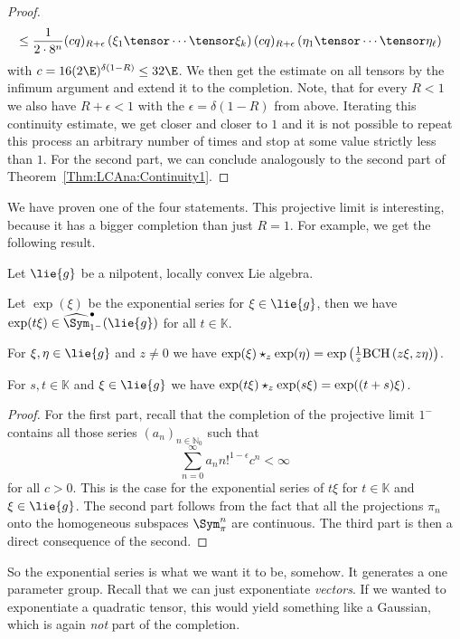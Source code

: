 \begin{proof}
\begin{align*}
        & \leq
        \frac{1}{2 \cdot 8^n}
        (c q)_{R + \epsilon} 
        \left( \xi_1 \tensor \cdots \tensor \xi_k \right)
        (c q)_{R + \epsilon} 
        \left( \eta_1 \tensor \cdots \tensor \eta_\ell \right)
    \end{align*}
    with $c = 16 (2 \E)^{\delta (1 - R)} \leq 32 \E$.
    We then get the estimate on all tensors by the infimum argument and extend 
    it to the completion. Note, that for every $R < 1$ we also have 
    $R + \epsilon < 1$ with the $\epsilon = \delta(1-R)$ from above. Iterating 
    this continuity estimate, we get closer and closer to $1$ and it is not 
    possible to repeat this process an arbitrary number of times and stop at 
    some value strictly less than $1$. For the second part, we can conclude 
    analogously to the second part of Theorem~\ref{Thm:LCAna:Continuity1}.
\end{proof}
We have proven one of the four statements. This projective limit is interesting, 
because it has a bigger completion than just $R = 1$. For example, we get the 
following result.
\begin{corollary}
    \label{corollary:NilpotentCase}%
    Let $\lie{g}$ be a nilpotent, locally convex Lie algebra.
    \begin{corollarylist}
    \item \label{item:NilpotentHasExp} 
    	Let $\exp(\xi)$ be the
        exponential series for $\xi \in \lie{g}$, then we have $\exp(t
        \xi) \in \widehat{\Sym}_{1^-}^\bullet(\lie{g})$ for all $t
        \in \mathbb{K}$.
    \item \label{item:NilpotentExpGivesBCH} 
    	For $\xi, \eta \in
        \lie{g}$ and $z \neq 0$ we have $\exp(\xi) \star_z
        \exp(\eta) = \exp \left(\frac 1 z \mathrm{BCH}\left(z \xi, z \eta\right)
        \right)$.
    \item \label{item:NipotentOneParameterGroups}
    	For $s,t \in
        \mathbb{K}$ and $\xi \in \lie{g}$ we have $\exp(t \xi)
        \star_z \exp(s \xi) = \exp ((t + s) \xi)$.
    \end{corollarylist}
\end{corollary}
\begin{proof}
    For the first part, recall that the completion of the projective
    limit $1^-$ contains all those series $(a_n)_{n \in
      \mathbb{N}_0}$ such that
    \begin{equation*}
        \sum\limits_{n=0}^{\infty}
        a_n n!^{1 - \epsilon} c^n
        <
        \infty
    \end{equation*}
    for all $c > 0$.  This is the case for the exponential series of
    $t \xi$ for $t \in \mathbb{K}$ and $\xi \in \lie{g}$. The second
    part follows from the fact that all the projections $\pi_n$ onto
    the homogeneous subspaces $\Sym_{\pi}^n$ are continuous. The third
    part is then a direct consequence of the second.
\end{proof}
So the exponential series is what we want it to be, somehow. It generates a one 
parameter group. Recall that we can just exponentiate \emph{vectors}. If we wanted 
to exponentiate a quadratic tensor, this would yield something like a Gaussian, 
which is again \emph{not} part of the completion.



